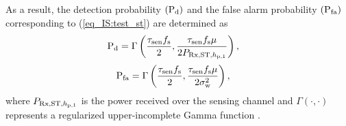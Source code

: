 As a result, the detection probability $(\text{P}_{\text{d}})$ and the false alarm probability $(\text{P}_{\text{fa}})$ corresponding to (\ref{eq_IS:test_st}) are determined as \cite{Tan08}
\begin{align}
\pd &= \Gamma\left( \frac{\tsen \fsam}{2}, \frac{\tsen \fsam \mu}{2 \prcvdstpt} \right),  \label{eq_IS:pd} 
\end{align}
\begin{align}
\pfa &= \Gamma\left( \frac{\tsen \fsam}{2}, \frac{\tsen \fsam \mu}{2 \npo} \right),  \label{eq_IS:pfa} 
\end{align}
where $P_{\text{Rx,ST,$h_{\text{p,1}}$}}$ is the power received over the sensing channel and $\Gamma(\cdot, \cdot)$ represents a regularized upper-incomplete Gamma function \cite{grad}.

